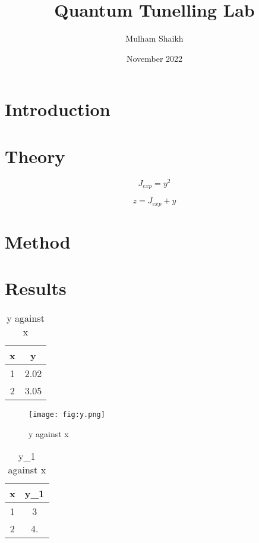\documentclass{article}
\title{Quantum Tunelling Lab}
\author{Mulham Shaikh}
\date{November 2022}
\begin{document}
\maketitle
\newpage
    \tableofcontents

\newpage
\section{Introduction}
\section{Theory}

\begin{equation}
	J_{exp} = y^{2}
    \label{eq:J_exp}
\end{equation}


\begin{equation}
	z = J_{exp} + y
    \label{eq:z}
\end{equation}

\section{Method}
\section{Results}

\begin{table}[H]
    \centering
    \begin{tabular}{|c|c|}
	\hline
	x & y\\
	\hline
	1 & 2.02\\
	\hline
	2 & 3.05\\
	\hline
        
    \end{tabular}
    \caption{y against x}
    \label{tab:y}
\end{table}


\begin{figure}[H]
    \centering
    \texttt{[image: fig:y.png]}
    \caption{y against x}
    \label{fig:y}
\end{figure}


\begin{table}[H]
    \centering
    \begin{tabular}{|c|c|}
	\hline
	x & y_1\\
	\hline
	1 & 3\\
	\hline
	2 & 4.\\
	\hline
        
    \end{tabular}
    \caption{y_1 against x}
    \label{tab:y_1}
\end{table}
\end{document}
